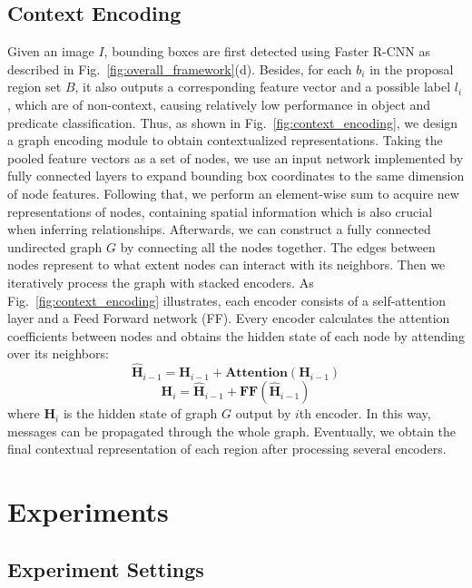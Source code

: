 \documentclass[sigconf]{acmart}
\begin{document}
\subsection{Context Encoding}
Given an image $I$, bounding boxes are first detected using Faster R-CNN as described in Fig.~\ref{fig:overall_framework}(d). Besides, for each ${b}_{i}$ in the proposal region set $B$, it also outputs a corresponding feature vector and a possible label ${l}_{i}$, which are of non-context, causing relatively low performance in object and predicate classification. Thus, as shown in Fig.~\ref{fig:context_encoding}, we design a graph encoding module to obtain contextualized representations. Taking the pooled feature vectors as a set of nodes, we use an input network implemented by fully connected layers to expand bounding box coordinates to the same dimension of node features. Following that, we perform an element-wise sum to acquire new representations of nodes, containing spatial information which is also crucial when inferring relationships. Afterwards, we can construct a fully connected undirected graph $G$ by connecting all the nodes together. The edges between nodes represent to what extent nodes can interact with its neighbors. Then we iteratively process the graph with stacked encoders. As Fig.~\ref{fig:context_encoding} illustrates, each encoder consists of a self-attention layer and a Feed Forward network (FF). Every encoder calculates the attention coefficients between nodes and obtains the hidden state of each node by attending over its neighbors:
\begin{equation}
    \hat{\textbf{H}}_{i-1} = \textbf{{H}}_{i-1} + \textbf{Attention}(\textbf{{H}}_{i-1})
\end{equation}
\begin{equation}
    \textbf{H}_{i} = \hat{\textbf{H}}_{i-1} + \textbf{FF}(\hat{\textbf{H}}_{i-1})
\end{equation}
where $\textbf{{H}}_{i}$ is the hidden state of graph $G$ output by $i$th encoder. In this way, messages can be propagated through the whole graph. Eventually, we obtain the final contextual representation of each region after processing several encoders.

\section{Experiments}
\subsection{Experiment Settings}
\end{document}
